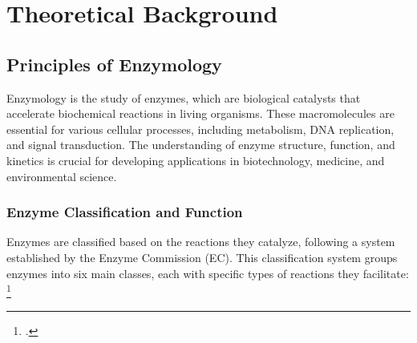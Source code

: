 \section{Theoretical Background}

\subsection{Principles of Enzymology}
\label{sec:Principles of Enzymology}

Enzymology is the study of enzymes, which are biological catalysts that accelerate biochemical reactions in living organisms. These macromolecules are essential for various cellular processes, including metabolism, DNA replication, and signal transduction. The understanding of enzyme structure, function, and kinetics is crucial for developing applications in biotechnology, medicine, and environmental science.



\subsubsection{Enzyme Classification and Function}
\label{sec:Enzyme Classification and Function}

Enzymes are classified based on the reactions they catalyze, following a system established by the Enzyme Commission (EC). This classification system groups enzymes into six main classes, each with specific types of reactions they facilitate: \footcite{EnzymesPrinciplesBiotechnological}

